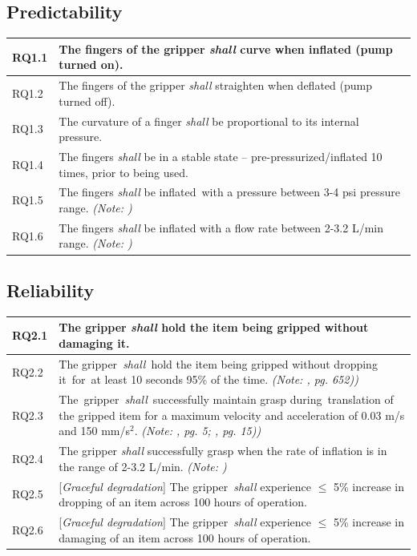 \documentclass[lettersize,journal]{IEEEtran}
\begin{document}
\subsection{Predictability}\label{predictability}
\begin{center}
	\begin{tabular}{|p{7mm}|p{72mm}|}
		\hline
		RQ1.1 & The fingers of the gripper \emph{shall} curve when inflated (pump turned on).  \\ 
		\hline
		RQ1.2 & The fingers of the gripper \emph{shall} straighten when deflated (pump turned off).  \\ 
		\hline
		RQ1.3 & The curvature of a finger \emph{shall} be proportional to its internal pressure. \\
		\hline
		RQ1.4 & The fingers \emph{shall} be in a stable state -- pre-pressurized/inflated 10 times, prior to being used. \\ 
		\hline
		RQ1.5 & The fingers \emph{shall} be inflated with a pressure between 3-4 psi pressure range. \emph{(Note: \cite{Partridge2022})} \\
		\hline
		RQ1.6 & The fingers \emph{shall} be inflated with a flow rate between 2-3.2 L/min range. \emph{(Note: \cite{DEWIN2022})} \\	[1ex] 		
		\hline
	\end{tabular}
\end{center}

\subsection{Reliability}\label{reliability}
\begin{center}
	\begin{tabular}{|p{7mm}|p{72mm}|}
		\hline
		RQ2.1 & The gripper \emph{shall} hold the item being gripped without damaging it.  \\ 
		\hline
		RQ2.2 & The gripper \emph{shall} hold the item being gripped without dropping it for at least 10 seconds 95\% of the time.  \emph{(Note: \cite{Sotiropoulos2018}, pg. 652))}\\ 
		\hline
		RQ2.3 & The gripper \emph{shall} successfully maintain grasp during translation of the gripped item for a maximum velocity and acceleration of 0.03 m/s and 150 mm/s$^2$. \emph{(Note: \cite{Triantafyllou2019}, pg. 5; \cite{Cheng2021}, pg. 15))}\\
		\hline
		RQ2.4& The gripper \emph{shall} successfully grasp when the rate of inflation is in the range of 2-3.2 L/min. \emph{(Note: \cite{DEWIN2022})}\\
		\hline
		RQ2.5 & [\emph{Graceful degradation}] The gripper \emph{shall} experience $\le$ 5\% increase in dropping of an item across 100 hours of operation. \\			\hline	
		RQ2.6 & [\emph{Graceful degradation}] The gripper \emph{shall} experience $\le$ 5\% increase in damaging of an item across 100 hours of operation.  \\		[1ex] 		
		\hline
	\end{tabular}
\end{center}
\end{document}
